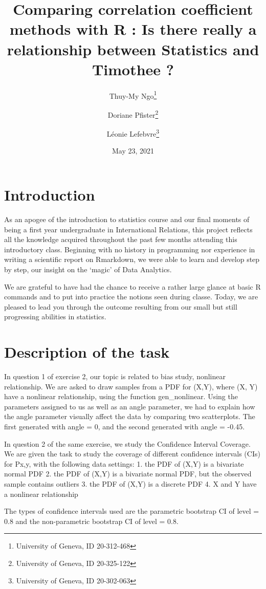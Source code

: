 \documentclass[11pt,]{article}
\title{Comparing correlation coefficient methods with R : Is there really a
relationship between Statistics and Timothee ?}
\author{Thuy-My Ngo\footnote{University of Geneva, ID 20-312-468} \and Doriane Pfister\footnote{University of Geneva, ID 20-325-122} \and Léonie Lefebvre\footnote{University of Geneva, ID 20-302-063}}
\date{May 23, 2021}
\begin{document}
\maketitle

\hypertarget{introduction}{%
\section{Introduction}\label{introduction}}

As an apogee of the introduction to statistics course and our final
moments of being a first year undergraduate in International Relations,
this project reflects all the knowledge acquired throughout the past few
months attending this introductory class. Beginning with no history in
programming nor experience in writing a scientific report on Rmarkdown,
we were able to learn and develop step by step, our insight on the
`magic' of Data Analytics.

We are grateful to have had the chance to receive a rather large glance
at basic R commands and to put into practice the notions seen during
classe. Today, we are pleased to lead you through the outcome resulting
from our small but still progressing abilities in statistics.

\hypertarget{description-of-the-task}{%
\section{Description of the task}\label{description-of-the-task}}

In question 1 of exercise 2, our topic is related to bias study,
nonlinear relationship. We are asked to draw samples from a PDF for
(X,Y), where (X, Y) have a nonlinear relationship, using the function
gen\_nonlinear. Using the parameters assigned to us as well as an angle
parameter, we had to explain how the angle parameter visually affect the
data by comparing two scatterplots. The first generated with angle = 0,
and the second generated with angle = -0.45.

In question 2 of the same exercise, we study the Confidence Interval
Coverage. We are given the task to study the coverage of different
confidence intervals (CIs) for Px,y, with the following data settings:
1. the PDF of (X,Y) is a bivariate normal PDF 2. the PDF of (X,Y) is a
bivariate normal PDF, but the observed sample contains outliers 3. the
PDF of (X,Y) is a discrete PDF 4. X and Y have a nonlinear relationship

The types of confidence intervals used are the parametric bootstrap CI
of level = 0.8 and the non-parametric bootstrap CI of level = 0.8.
\end{document}
